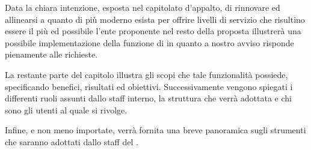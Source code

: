 Data la chiara intenzione, esposta nel capitolato d'appalto, di rinnovare ed allinearsi a quanto di più moderno esista per offrire livelli di servizio che risultino essere il più  ed  possibile l'ente proponente nel resto della proposta illustrerà una possibile implementazione della funzione di  in quanto a nostro avviso risponde pienamente alle richieste.

La restante parte del capitolo illustra gli scopi che tale funzionalità possiede, specificando benefici, risultati ed obiettivi. Successivamente vengono spiegati i differenti ruoli assunti dallo staff interno, la struttura che verrà adottata e chi sono gli utenti al quale si rivolge.

Infine, e non meno importate, verrà fornita una breve panoramica sugli strumenti che saranno adottati dallo staff del .